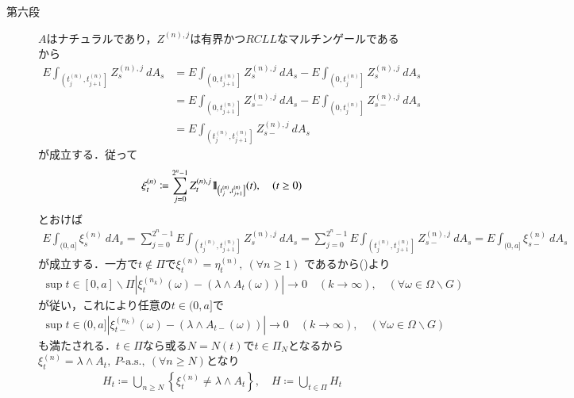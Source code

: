 \begin{prf}
\begin{description}
			\item[第六段]
				$A$はナチュラルであり，$Z^{(n),j}$は有界かつ$RCLL$なマルチンゲールであるから
				\begin{align}
					E\int_{\left(t^{(n)}_j,t^{(n)}_{j+1}\right]} Z^{(n),j}_s\ dA_s
					&= E\int_{\left(0,t^{(n)}_{j+1}\right]} Z^{(n),j}_s\ dA_s
						- E\int_{\left(0,t^{(n)}_j\right]} Z^{(n),j}_s\ dA_s \\
					&= E\int_{\left(0,t^{(n)}_{j+1}\right]} Z^{(n),j}_{s-}\ dA_s
						- E\int_{\left(0,t^{(n)}_j\right]} Z^{(n),j}_{s-}\ dA_s \\
					&= E\int_{\left(t^{(n)}_j,t^{(n)}_{j+1}\right]} Z^{(n),j}_{s-}\ dA_s
				\end{align}
				が成立する．従って
				\begin{align}
					\xi^{(n)}_t \coloneqq
					\sum_{j=0}^{2^n-1} Z^{(n),j}_t \mbox{1}\hspace{-0.25em}\mbox{l}_{\left(t^{(n)}_j,t^{(n)}_{j+1}\right]}(t),
					\quad (t \geq 0)
				\end{align}
				とおけば
				\begin{align}
					E\int_{(0,a]} \xi^{(n)}_s\ dA_s
					= \sum_{j=0}^{2^n-1} E\int_{\left(t^{(n)}_j,t^{(n)}_{j+1}\right]} Z^{(n),j}_s\ dA_s
					= \sum_{j=0}^{2^n-1} E\int_{\left(t^{(n)}_j,t^{(n)}_{j+1}\right]} Z^{(n),j}_{s-}\ dA_s
					= E\int_{(0,a]} \xi^{(n)}_{s-}\ dA_s
				\end{align}
				が成立する．一方で$t \notin \Pi$で$\xi^{(n)}_t = \eta^{(n)}_t,\ (\forall n \geq 1)$
				であるから()より
				\begin{align}
					\sup{t \in [0,a]\backslash\Pi}{\left|\xi^{(n_k)}_t(\omega) - (\lambda \wedge A_t(\omega))\right|}
					\longrightarrow 0 \quad (k \longrightarrow \infty),
					\quad (\forall \omega \in \Omega \backslash G)
				\end{align}
				が従い，これにより任意の$t \in (0,a]$で
				\begin{align}
					\sup{t \in (0,a]}{\left|\xi^{(n_k)}_{t-}(\omega) - (\lambda \wedge A_{t-}(\omega))\right|}
					\longrightarrow 0 \quad (k \longrightarrow \infty),
					\quad (\forall \omega \in \Omega \backslash G)
				\end{align}
				も満たされる．$t \in \Pi$なら或る$N = N(t)$で$t \in \Pi_N$となるから
				$\xi^{(n)}_t = \lambda \wedge A_t,\ \mbox{$P$-a.s.},\ (\forall n \geq N)$となり
				\begin{align}
					H_t \coloneqq \bigcup_{n \geq N} \left\{\xi^{(n)}_t \neq \lambda \wedge A_t\right\},
					\quad H \coloneqq \bigcup_{t \in \Pi} H_t
				\end{align}

\end{description}
\end{prf}
